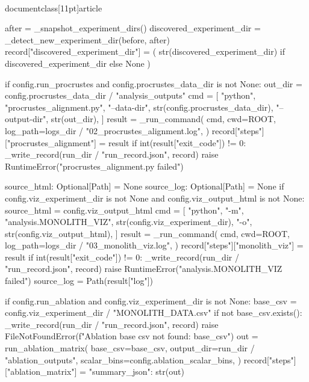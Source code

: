 \\documentclass[11pt]{article}
\begin{document}
\begin{CodeBlock}
    after = _snapshot_experiment_dirs()
    discovered_experiment_dir = _detect_new_experiment_dir(before, after)
    record["discovered_experiment_dir"] = (
        str(discovered_experiment_dir) if discovered_experiment_dir else None
    )

    if config.run_procrustes and config.procrustes_data_dir is not None:
        out_dir = config.procrustes_data_dir / "analysis_outputs"
        cmd = [
            "python",
            "procrustes_alignment.py",
            "--data-dir",
            str(config.procrustes_data_dir),
            "--output-dir",
            str(out_dir),
        ]
        result = _run_command(
            cmd,
            cwd=ROOT,
            log_path=logs_dir / "02_procrustes_alignment.log",
        )
        record["steps"]["procrustes_alignment"] = result
        if int(result["exit_code"]) != 0:
            _write_record(run_dir / "run_record.json", record)
            raise RuntimeError("procrustes_alignment.py failed")

    source_html: Optional[Path] = None
    source_log: Optional[Path] = None
    if config.viz_experiment_dir is not None and config.viz_output_html is not None:
        source_html = config.viz_output_html
        cmd = [
            "python",
            "-m",
            "analysis.MONOLITH_VIZ",
            str(config.viz_experiment_dir),
            "-o",
            str(config.viz_output_html),
        ]
        result = _run_command(
            cmd,
            cwd=ROOT,
            log_path=logs_dir / "03_monolith_viz.log",
        )
        record["steps"]["monolith_viz"] = result
        if int(result["exit_code"]) != 0:
            _write_record(run_dir / "run_record.json", record)
            raise RuntimeError("analysis.MONOLITH_VIZ failed")
        source_log = Path(result["log"])

    if config.run_ablation and config.viz_experiment_dir is not None:
        base_csv = config.viz_experiment_dir / "MONOLITH_DATA.csv"
        if not base_csv.exists():
            _write_record(run_dir / "run_record.json", record)
            raise FileNotFoundError(f"Ablation base csv not found: {base_csv}")
        out = run_ablation_matrix(
            base_csv=base_csv,
            output_dir=run_dir / "ablation_outputs",
            scalar_bins=config.ablation_scalar_bins,
        )
        record["steps"]["ablation_matrix"] = {"summary_json": str(out)}


\end{CodeBlock}
\end{document}
